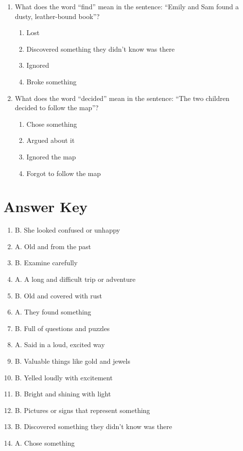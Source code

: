 \documentclass[12pt]{article}
\begin{document}
\begin{enumerate}
    \item What does the word “find” mean in the sentence: “Emily and Sam found a dusty, leather-bound book”?
    \begin{enumerate}[label=\Alph*.]
        \item Lost
        \item Discovered something they didn’t know was there
        \item Ignored
        \item Broke something
    \end{enumerate}
    \vspace{0.5cm}

    \item What does the word “decided” mean in the sentence: “The two children decided to follow the map”?
    \begin{enumerate}[label=\Alph*.]
        \item Chose something
        \item Argued about it
        \item Ignored the map
        \item Forgot to follow the map
    \end{enumerate}
    \vspace{0.5cm}

\end{enumerate}
\newpage

\section*{Answer Key}

\begin{enumerate}

    \item B. She looked confused or unhappy
    \item A. Old and from the past
    \item B. Examine carefully
    \item A. A long and difficult trip or adventure
    \item B. Old and covered with rust
    \item A. They found something
    \item B. Full of questions and puzzles
    \item A. Said in a loud, excited way
    \item B. Valuable things like gold and jewels
    \item B. Yelled loudly with excitement
    \item B. Bright and shining with light
    \item B. Pictures or signs that represent something
    \item B. Discovered something they didn’t know was there
    \item A. Chose something

\end{enumerate}
\end{document}
